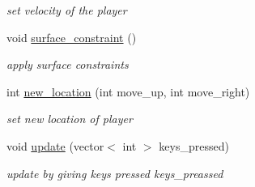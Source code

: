\begin{DoxyCompactItemize}
\begin{DoxyCompactList}\small\item\em set velocity of the player \end{DoxyCompactList}\item 
\hypertarget{classplayer_a257611bfa4cf23026b49d4e1889b0573}{void \hyperlink{classplayer_a257611bfa4cf23026b49d4e1889b0573}{surface\+\_\+constraint} ()}\label{classplayer_a257611bfa4cf23026b49d4e1889b0573}

\begin{DoxyCompactList}\small\item\em apply surface constraints \end{DoxyCompactList}\item 
int \hyperlink{classplayer_a180491e3ff129f61c3325adaf82a4a2f}{new\+\_\+location} (int move\+\_\+up, int move\+\_\+right)
\begin{DoxyCompactList}\small\item\em set new location of player \end{DoxyCompactList}\item 
void \hyperlink{classplayer_a5b4cf14edbfd27cc62178e47e82dce3a}{update} (vector$<$ int $>$ keys\+\_\+pressed)
\begin{DoxyCompactList}\small\item\em update by giving keys pressed keys\+\_\+preassed \end{DoxyCompactList}\end{DoxyCompactItemize}
